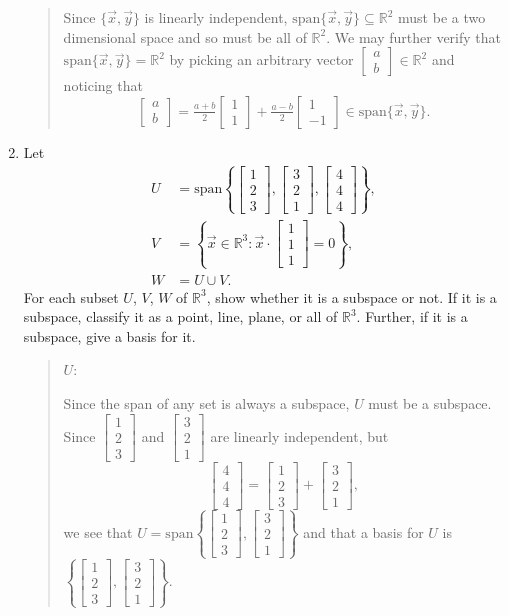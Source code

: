 \documentclass[letter]{article}
\newcommand{\R}{\mathbb{R}}
\newcommand{\Span}{\mathrm{span}}
\newcommand{\mat}[1]{\begin{bmatrix}#1\end{bmatrix}}
\begin{document}
\begin{enumerate}
\begin{quote}
				Since $\{\vec x,\vec y\}$ is linearly independent, $\Span\{\vec x,\vec y\}\subseteq \R^2$
				must be a two dimensional space and so must be all of $\R^2$.  We may further verify
				that $\Span\{\vec x,\vec y\}= \R^2$ by picking an arbitrary 
				vector $\mat{a\\b}\in\R^2$ and noticing that
				\[
					\mat{a\\b} = \tfrac{a+b}{2}\mat{1\\1}+\tfrac{a-b}{2}\mat{1\\-1}\in \Span\{\vec x,\vec y\}.
				\]
			\end{quote}

		\item Let 
			\begin{align*}
				U&=\Span\left\{\mat{1\\2\\3},\mat{3\\2\\1},\mat{4\\4\\4}\right\},\\
				V&=\left\{\vec x\in\R^3:\vec x\cdot\mat{1\\1\\1}=0\right\},\\
				W&=U\cup V.
			\end{align*}
			For each subset $U$, $V$, $W$ of $\R^3$, show whether it is a subspace or not.  If it is a subspace,
			classify it as a point, line, plane, or all of $\R^3$.  Further, if it is a subspace, give a basis
			for it.
			\begin{quote}
				$U$:

				Since the span of any set is always a subspace, $U$ must be a subspace.  Since $\mat{1\\2\\3}$ and
				$\mat{3\\2\\1}$ are linearly independent, but 
				\[
					\mat{4\\4\\4}=\mat{1\\2\\3}+\mat{3\\2\\1},
				\]
				we see that $U=\Span\left\{\mat{1\\2\\3},\mat{3\\2\\1}\right\}$ and that a basis for
				$U$ is $\left\{\mat{1\\2\\3},\mat{3\\2\\1}\right\}$.


\end{quote}
\end{enumerate}
\end{document}
